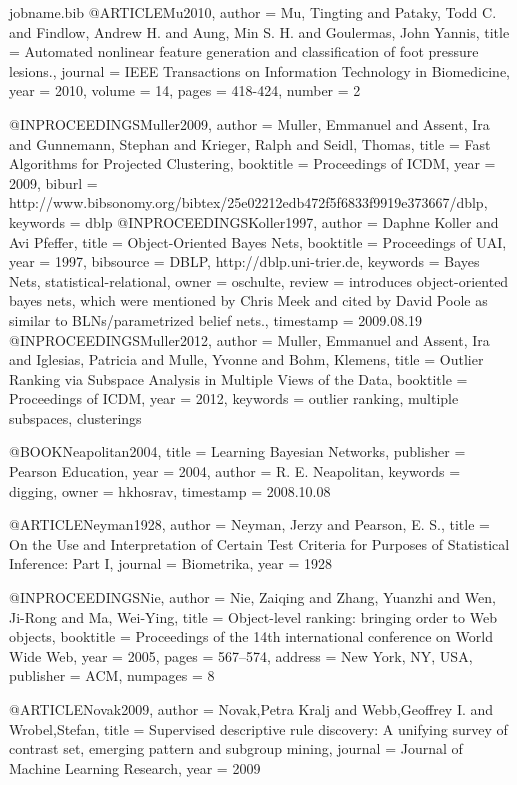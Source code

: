 {\begin{filecontents*}{jobname.bib}
	@ARTICLE{Mu2010,
		author = {Mu, Tingting and Pataky, Todd C. and Findlow, Andrew H. and Aung,
			Min S. H. and Goulermas, John Yannis},
		title = {Automated nonlinear feature generation and classification of foot
			pressure lesions.},
		journal = {IEEE Transactions on Information Technology in Biomedicine},
		year = {2010},
		volume = {14},
		pages = {418-424},
		number = {2}
	}
	
	@INPROCEEDINGS{Muller2009,
		author = {Muller, Emmanuel and Assent, Ira and Gunnemann, Stephan and Krieger,
			Ralph and Seidl, Thomas},
		title = {Fast Algorithms for Projected Clustering},
		booktitle = {Proceedings of ICDM},
		year = {2009},
		biburl = {http://www.bibsonomy.org/bibtex/25e02212edb472f5f6833f9919e373667/dblp},
		keywords = {dblp}
	}
	@INPROCEEDINGS{Koller1997,
		author = {Daphne Koller and Avi Pfeffer},
		title = {Object-Oriented {B}ayes Nets},
		booktitle = {Proceedings of UAI},
		year = {1997},
		bibsource = {DBLP, http://dblp.uni-trier.de},
		keywords = {{B}ayes Nets, statistical-relational},
		owner = {oschulte},
		review = {introduces object-oriented bayes nets, which were mentioned by Chris
			Meek and cited by David Poole as similar to BLNs/parametrized belief
			nets.},
		timestamp = {2009.08.19}
	}
	@INPROCEEDINGS{Muller2012,
		author = {Muller, Emmanuel and Assent, Ira and Iglesias, Patricia and Mulle,
			Yvonne and Bohm, Klemens},
		title = {Outlier Ranking via Subspace Analysis in Multiple Views of the Data},
		booktitle = {Proceedings of ICDM},
		year = {2012},
		keywords = {outlier ranking, multiple subspaces, clusterings}
	}
	
	@BOOK{Neapolitan2004,
		title = {Learning {B}ayesian Networks},
		publisher = {Pearson Education},
		year = {2004},
		author = {R. E. Neapolitan},
		keywords = {digging},
		owner = {hkhosrav},
		timestamp = {2008.10.08}
	}
	
	@ARTICLE{Neyman1928,
		author = {Neyman, Jerzy and Pearson, E. S.},
		title = {On the Use and Interpretation of Certain Test Criteria for Purposes
			of Statistical Inference: Part I},
		journal = {Biometrika},
		year = {1928}
	}
	
	@INPROCEEDINGS{Nie,
		author = {Nie, Zaiqing and Zhang, Yuanzhi and Wen, Ji-Rong and Ma, Wei-Ying},
		title = {Object-level ranking: bringing order to Web objects},
		booktitle = {Proceedings of the 14th international conference on World Wide Web},
		year = {2005},
		pages = {567--574},
		address = {New York, NY, USA},
		publisher = {ACM},
		numpages = {8}
	}
	
	@ARTICLE{Novak2009,
		author = {Novak,Petra Kralj and Webb,Geoffrey I. and Wrobel,Stefan},
		title = {Supervised descriptive rule discovery: A unifying survey of contrast
			set, emerging pattern and subgroup mining},
		journal = {Journal of Machine Learning Research},
		year = {2009}
	}
	

\end{filecontents*}}
